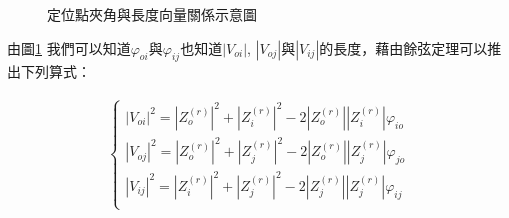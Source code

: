 	\begin{figure}
    \begin{center}
    \end{center}
    \caption{定位點夾角與長度向量關係示意圖}
    \label{fig:Localization Relationship}
    \end{figure}


	由圖\ref{fig:Localization Relationship} 我們可以知道$\varphi _{oi}$與$\varphi _{ij}$也知道$|V_{oi}|$, $|V_{oj}|$與$|V_{ij}|$的長度，藉由餘弦定理可以推出下列算式：
	
	\begin{align}
		\left\{
		\begin{array}{cccc}
		|V_{oi}|^2 = |Z_o^{(r)}|^2 + |Z_i^{(r)}|^2 - 2|Z_o^{(r)}||Z_i^{(r)}|\varphi _{io}\\
		|V_{oj}|^2 = |Z_o^{(r)}|^2 + |Z_j^{(r)}|^2 - 2|Z_o^{(r)}||Z_j^{(r)}|\varphi _{jo}\\
		|V_{ij}|^2 = |Z_i^{(r)}|^2 + |Z_j^{(r)}|^2 - 2|Z_j^{(r)}||Z_j^{(r)}|\varphi _{ij}\\
		\end{array}
		\right.
	\end{align}	
	
